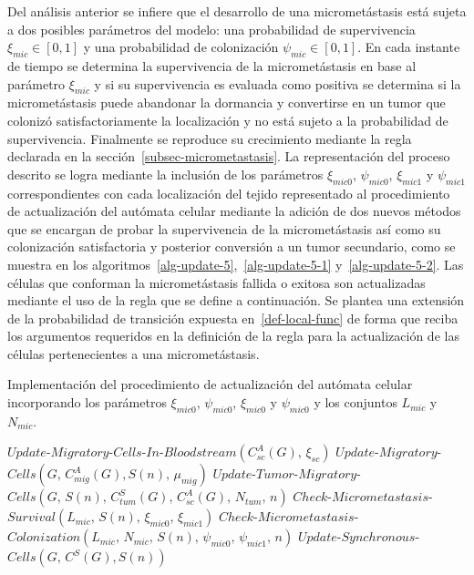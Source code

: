 Del an\'alisis anterior se infiere que el desarrollo de una micromet\'astasis est\'a sujeta a dos posibles par\'ametros del modelo: una probabilidad de supervivencia $\xi_{mic} \in [0,1]$ y una probabilidad de colonizaci\'on $\psi_{mic} \in [0,1]$. En cada instante de tiempo se determina la supervivencia de la micromet\'astasis en base al par\'ametro $\xi_{mic}$ y si su supervivencia es evaluada como positiva se determina si la micromet\'astasis puede abandonar la dormancia y convertirse en un tumor que coloniz\'o satisfactoriamente la localizaci\'on y no est\'a sujeto a la probabilidad de supervivencia. Finalmente se reproduce su crecimiento mediante la regla declarada en la secci\'on~\ref{subsec-micrometastasis}. La representaci\'on del proceso descrito se logra mediante la inclusi\'on de los par\'ametros $\xi_{mic0}$, $\psi_{mic0}$, $\xi_{mic1}$ y $\psi_{mic1}$ correspondientes con cada localizaci\'on del tejido representado al procedimiento de actualizaci\'on del aut\'omata celular mediante la adici\'on de dos nuevos m\'etodos que se encargan de probar la supervivencia de la micromet\'astasis as\'i como su colonizaci\'on satisfactoria y posterior conversi\'on a un tumor secundario, como se muestra en los algoritmos~\ref{alg-update-5},~\ref{alg-update-5-1} y~\ref{alg-update-5-2}. Las c\'elulas que conforman la micromet\'astasis fallida o exitosa son actualizadas mediante el uso de la regla que se define a continuaci\'on. Se plantea una extensi\'on de la probabilidad de transici\'on expuesta en~\ref{def-local-func} de forma que reciba los argumentos requeridos en la definici\'on de la regla para la actualizaci\'on de las c\'elulas pertenecientes a una micromet\'astasis. 

\begin{algorithm}[!ht]
\caption{Implementaci\'on del procedimiento de actualizaci\'on del aut\'omata celular incorporando los par\'ametros $\xi_{mic0}$, $\psi_{mic0}$, $\xi_{mic0}$ y $\psi_{mic0}$ y los conjuntos $L_{mic}$ y $N_{mic}$.} \label{alg-update-5}
$Update$-$Migratory$-$Cells$-$In$-$Bloodstream(C_{sc}^A(G),\,\xi_{sc})$\;
$Update$-$Migratory$-$Cells(G,\,C_{mig}^A(G),S(n),\,\mu_{mig})$\;
$Update$-$Tumor$-$Migratory$-$Cells(G,\,S(n),\,C_{tum}^S(G),\,C_{sc}^A(G),\,N_{tum},\,n)$\;
$Check$-$Micrometastasis$-$Survival(L_{mic},\,S(n),\,\xi_{mic0},\,\xi_{mic1})$\;
$Check$-$Micrometastasis$-$Colonization(L_{mic},\,N_{mic},\,S(n),\,\psi_{mic0},\,\psi_{mic1},\,n)$\;
$Update$-$Synchronous$-$Cells(G,\,C^S(G),S(n))$\;
\end{algorithm}


